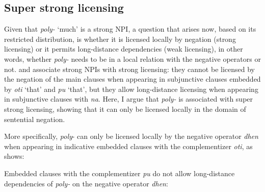 \documentclass[output=paper]{langscibook}
\begin{document}
\subsection{Super strong licensing} \label{gia:sub:super}

Given that \textit{poly-} `much' is a strong NPI, a question that arises now, based on its restricted distribution, is whether it is licensed locally by negation (strong licensing) or it permits long-distance dependencies (weak licensing), in other words, whether \textit{poly-} needs to be in a local relation with the negative operators or not. \citet{giannaki1995subj,giannaki1997dissert,giannaki1998} and \citet{giannakiquer1995,giannakiquer1997} associate strong NPIs with strong licensing: they cannot be licensed by the negation of the main clauses when appearing in subjunctive clauses embedded by \textit{oti} `that' and \textit{pu} `that', but they allow long-distance licensing when appearing in subjunctive clauses with \textit{na}. Here, I argue that \textit{poly-} is associated with super strong licensing, showing that it can only be licensed locally in the domain of sentential negation.

More specifically, \textit{poly}- can only be licensed locally by the negative operator \textit{dhen} when appearing in indicative embedded clauses with the complementizer \textit{oti}, as  shows:

\begin{exe}
\ex\label{gia:ex18} \begin{xlist}
        \label{gia:ex18b}
    \end{xlist}
\end{exe}

\noindent Embedded clauses with the complementizer \textit{pu} do not allow long-distance dependencies of \textit{poly-} on the negative operator \textit{dhen}:

\begin{exe}
\ex\label{gia:ex19} \begin{xlist}
        \label{gia:ex19b}
    \end{xlist}
\end{exe}
\end{document}

